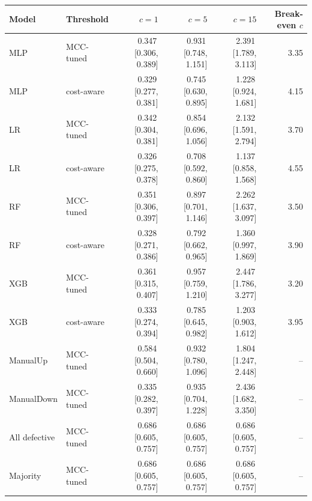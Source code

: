 \small
\begin{tabular}{llrrrr}
\toprule
Model & Threshold & $c = 1$ & $c = 5$ & $c = 15$ & Break-even $c$ \\
\midrule
MLP & MCC-tuned & 0.347\,{\scriptsize[0.306, 0.389]} & 0.931\,{\scriptsize[0.748, 1.151]} & 2.391\,{\scriptsize[1.789, 3.113]} & 3.35 \\
MLP & cost-aware & 0.329\,{\scriptsize[0.277, 0.381]} & 0.745\,{\scriptsize[0.630, 0.895]} & 1.228\,{\scriptsize[0.924, 1.681]} & 4.15 \\
LR & MCC-tuned & 0.342\,{\scriptsize[0.304, 0.381]} & 0.854\,{\scriptsize[0.696, 1.056]} & 2.132\,{\scriptsize[1.591, 2.794]} & 3.70 \\
LR & cost-aware & 0.326\,{\scriptsize[0.275, 0.378]} & 0.708\,{\scriptsize[0.592, 0.860]} & 1.137\,{\scriptsize[0.858, 1.568]} & 4.55 \\
RF & MCC-tuned & 0.351\,{\scriptsize[0.306, 0.397]} & 0.897\,{\scriptsize[0.701, 1.146]} & 2.262\,{\scriptsize[1.637, 3.097]} & 3.50 \\
RF & cost-aware & 0.328\,{\scriptsize[0.271, 0.386]} & 0.792\,{\scriptsize[0.662, 0.965]} & 1.360\,{\scriptsize[0.997, 1.869]} & 3.90 \\
XGB & MCC-tuned & 0.361\,{\scriptsize[0.315, 0.407]} & 0.957\,{\scriptsize[0.759, 1.210]} & 2.447\,{\scriptsize[1.786, 3.277]} & 3.20 \\
XGB & cost-aware & 0.333\,{\scriptsize[0.274, 0.394]} & 0.785\,{\scriptsize[0.645, 0.982]} & 1.203\,{\scriptsize[0.903, 1.612]} & 3.95 \\
ManualUp & MCC-tuned & 0.584\,{\scriptsize[0.504, 0.660]} & 0.932\,{\scriptsize[0.780, 1.096]} & 1.804\,{\scriptsize[1.247, 2.448]} & -- \\
ManualDown & MCC-tuned & 0.335\,{\scriptsize[0.282, 0.397]} & 0.935\,{\scriptsize[0.704, 1.228]} & 2.436\,{\scriptsize[1.682, 3.350]} & -- \\
All defective & MCC-tuned & 0.686\,{\scriptsize[0.605, 0.757]} & 0.686\,{\scriptsize[0.605, 0.757]} & 0.686\,{\scriptsize[0.605, 0.757]} & -- \\
Majority & MCC-tuned & 0.686\,{\scriptsize[0.605, 0.757]} & 0.686\,{\scriptsize[0.605, 0.757]} & 0.686\,{\scriptsize[0.605, 0.757]} & -- \\
\bottomrule
\end{tabular}
